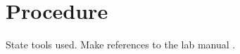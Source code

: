\section{Procedure}\label{sec:procedure}
State tools used.
Make references to the lab manual \cite{lab-manual}.
